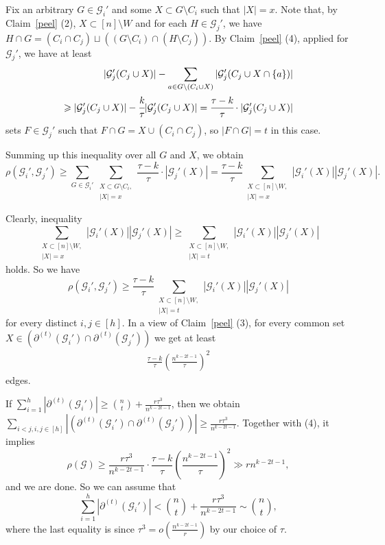 \documentclass[12pt,a4paper]{article}
\newcommand{\cG}{\mathcal{G}}
\begin{document}
Fix an arbitrary $G \in \mathcal{G}_i'$ and some $X \subset G \setminus C_i$ such that $|X|=x$. Note that, by Claim~\ref{peel} (2), $X \subset [n] \setminus W$ and for each $H \in \cG_j'$, we have $H \cap G = (C_i \cap C_j) \sqcup ((G \setminus C_i) \cap (H \setminus C_j)).$ By Claim~\ref{peel} (4), applied for $\cG_j'$, we have at least
\begin{align*}
    |\mathcal{G}_j'(C_j \cup X)| - \sum_{a \in G \setminus (C_i \cup X)} |\mathcal{G}_j'( C_j \cup X \cap \{a\})| \\\geqslant|\mathcal{G}_j'(C_j \cup X)| - \cfrac{k}{\tau}|\mathcal{G}_j'(C_j \cup X)|
    = \cfrac{\tau - k}{\tau} \cdot |\mathcal{G}_j'(C_j \cup X)|    
\end{align*}
sets $F \in \mathcal{G}_j'$ such that $F \cap G = X \cup (C_i \cap C_j)$, so $|F \cap G|=t$ in this case. 

Summing up this inequality over all $G$ and $X$, we obtain
$$
\rho(\mathcal{G}_i', \mathcal{G}_j') \geqslant\sum_{G \in \mathcal{G}_i'} \sum_{\substack{X \subset G \setminus C_i,\\ |X|=x}} \frac{\tau - k}{\tau} \cdot |\mathcal{G}_j'(X)| = \frac{\tau - k}{\tau}  \sum_{\substack{X \subset [n] \setminus W,\\ |X|=x}} |\mathcal{G}_i'(X)||\mathcal{G}_j'(X)|.
$$

Clearly, inequality
$$\sum_{\substack{X \subset [n] \setminus W,\\ |X|=x}} |\mathcal{G}_i'(X)||\mathcal{G}_j'(X)| \geqslant \sum_{\substack{X \subset [n] \setminus W,\\ |X|=t}} |\mathcal{G}_i'(X)||\mathcal{G}_j'(X)|$$
holds. So we have
$$\rho(\cG_i', \cG_j') \geqslant \frac{\tau-k}{\tau} \sum_{\substack{X \subset [n] \setminus W,\\ |X|=t}} |\mathcal{G}_i'(X)||\mathcal{G}_j'(X)|$$
for every distinct $i,j \in [h]$. In a view of Claim~\ref{peel} (3), for every common set $X\in (\partial^{(t)}(\cG_i') \cap \partial^{(t)}(\cG_j'))$ we get at least
\begin{align}
    \frac{\tau-k}{\tau}\left(\frac{n^{k-2t-1}}{\tau}\right)^2    
\end{align}
edges.

If $\sum_{i=1}^h |\partial^{(t)}(\cG_i')| \geqslant \binom{n}{t} + \frac{r\tau^3}{n^{k-2t-1}}$, then we obtain $\sum_{i<j, i,j \in [h]} |(\partial^{(t)}(\cG_i') \cap \partial^{(t)}(\cG_j'))| \geqslant \frac{r\tau^3}{n^{k-2t-1}}$. Together with (4), it implies
$$\rho(\cG) \geqslant \frac{r\tau^3}{n^{k-2t-1}} \cdot \frac{\tau-k}{\tau}\left(\frac{n^{k-2t-1}}{\tau}\right)^2 \gg rn^{k-2t-1},$$
and we are done. So we can assume that 
\begin{equation}
    \sum_{i=1}^h |\partial^{(t)}(\cG_i')| < \binom{n}{t} +  \frac{r\tau^3}{n^{k-2t-1}} \sim \binom{n}{t},    
\end{equation}
where the last equality is since $\tau^3 = o(\frac{n^{k-2t-1}}{r})$ by our choice of $\tau$.
\end{document}
